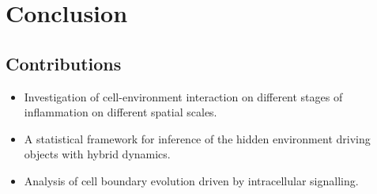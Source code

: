 \documentclass[12pt]{beamer}
\begin{document}

\section{Conclusion}
\subsection{Contributions}
\begin{frame}
\begin{itemize}
	\item
	Investigation of cell-environment interaction on different stages of inflammation on different spatial scales.
	\item
	A statistical framework for inference of the hidden environment driving objects with hybrid dynamics.
	\item
	Analysis of cell boundary evolution driven by intracellular signalling.
\end{itemize}
\end{frame}
\end{document}
